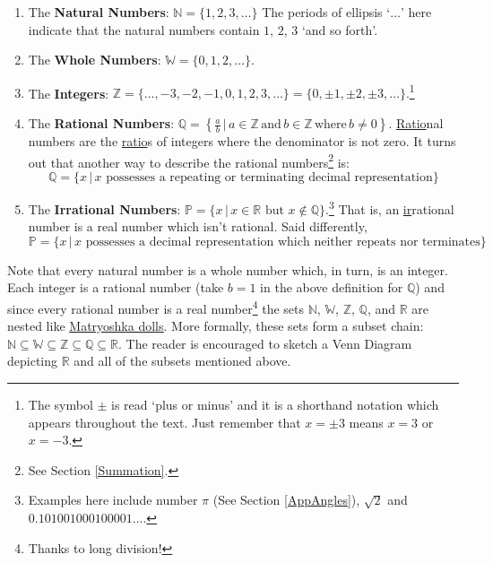 \documentclass{ximera}
\begin{document}
\begin{enumerate}

\item The \textbf{Natural Numbers}: $\mathbb{N}= \{ 1, 2, 3,  \ldots\}$ The periods of ellipsis `$\ldots$' here indicate that the natural numbers contain $1$, $2$, $3$ `and so forth'.

\item The \textbf{Whole Numbers}: $\mathbb{W} = \{ 0, 1, 2, \ldots \}.$

\item The \textbf{Integers}: $\mathbb Z=\{ \ldots, -3, -2, -1, 0, 1, 2, 3, \ldots \} = \{ 0, \pm 1, \pm 2, \pm 3, \ldots\}.$\footnote{The symbol $\pm$ is read `plus or minus' and it is a shorthand notation which appears throughout the text.  Just remember that $x = \pm 3$ means $x = 3$ or $x = -3$.}

\item The \textbf{Rational Numbers}: $\mathbb{Q}=\left\{\frac{a}{b} \, | \, a \in \mathbb Z \, \mbox{and} \, b \in \mathbb Z \, \mbox{where} \, b \neq 0\right\}$.  \underline{Ratio}nal numbers are the \underline{ratio}s of integers where the denominator is not zero.  It turns out that another way to describe the rational numbers\footnote{See Section \ref{Summation}.} is: \[\mathbb{Q}=\{x\,|\,\mbox{$x$ possesses a repeating or terminating decimal representation}\}\]

\item The \textbf{Irrational Numbers}: $\mathbb P = \{x\,|\,\mbox{$x \in \mathbb{R}$ but $x \notin \mathbb{Q}$}\}$.\footnote{Examples here include number $\pi$ (See Section \ref{AppAngles}), $\sqrt{2}$ and $0.101001000100001\ldots$.}  That is, an \underline{ir}rational number is a real number which isn't rational.  Said differently, \[\mathbb P = \{x\,|\,\mbox{$x$ possesses a decimal representation which neither repeats nor terminates}\}\]

\end{enumerate}


 

Note that every natural number is a whole number which, in turn, is an integer.   Each integer is a rational number (take $b =1$ in the above definition for $\mathbb{Q}$) and since every rational number is a real number\footnote{Thanks to long division!}  the sets $\mathbb{N}$, $\mathbb{W}$, $\mathbb Z$, $\mathbb{Q}$, and  $\mathbb{R}$ are nested like \href{http://en.wikipedia.org/wiki/Matryoshka_doll}{\underline{Matryoshka dolls}}. More formally, these sets form a subset chain:  $\mathbb{N} \subseteq \mathbb{W} \subseteq \mathbb Z \subseteq \mathbb{Q}\subseteq \mathbb{R}$.  The reader is encouraged to sketch a Venn Diagram depicting $\mathbb{R}$ and all of the subsets mentioned above.  
\end{document}
